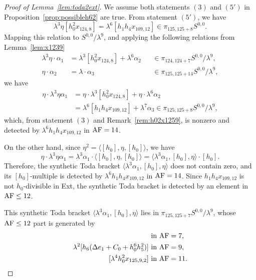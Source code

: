 \begin{proof}[Proof of Lemma~\ref{lem:toda2ext}]
    We assume both statements $(3)$ and $(5')$ in Proposition~\ref{prop:possibleh62} are true. From statement $(5')$, we have 
    $$\lambda^3 \eta [h_0^2x_{124,8}] = \lambda^6 [h_1h_4x_{109,12}] \in \pi_{125,125+8} S^{0,0}.$$
Mapping this relation to $S^{0,0}/\lambda^9$, and applying the following relations from Lemma~\ref{lem:x1239}
\begin{align*}
        \lambda^3 \eta \cdot \alpha_1 & = \lambda^3 [h_0^2 x_{124,8}] + 
\lambda^6 \alpha_2 && \in \pi_{124,124+7} S^{0,0}/\lambda^9,\\
\eta \cdot \alpha_2 & = \lambda \cdot \alpha_3 && \in \pi_{125,125+14} S^{0,0}/\lambda^9,
    \end{align*}
we have
\begin{align*}
    \eta \cdot \lambda^3 \eta \alpha_1 & = \eta \cdot \lambda^3 [h_0^2 x_{124,8}] + \eta \cdot \lambda^6 \alpha_2\\
   & = \lambda^6 [h_1h_4x_{109,12}] + \lambda^7 \alpha_3 \in \pi_{125,125+8} S^{0,0}/\lambda^9,
 \end{align*}
 which, from statement $(3)$ and Remark~\ref{rem:h02x1259}, is nonzero and detected by $\lambda^6 h_1h_4x_{109,12}$ in $\mathrm{AF}=14$.
 
 On the other hand, since $\eta^2 = \langle [h_0], \eta, [h_0] \rangle$, we have
 $$\eta \cdot \lambda^3 \eta \alpha_1 = \lambda^3 \alpha_1 \cdot \langle [h_0], \eta, [h_0] \rangle = \langle \lambda^3 \alpha_1, [h_0], \eta \rangle \cdot [h_0].$$
 Therefore, the synthetic Toda bracket
$\langle \lambda^3 \alpha_1, [h_0], \eta \rangle$
    does not contain zero, and its $[h_0]$-multiple is detected by $\lambda^6 h_1h_4x_{109,12}$ in $\mathrm{AF}=14$. Since $h_1h_4x_{109,12}$ is not $h_0$-divisible in Ext, the synthetic Toda bracket is detected by an element in $\mathrm{AF} \le 12$.
    

This synthetic Toda bracket $\langle \lambda^3 \alpha_1, [h_0], \eta \rangle$ lies in $\pi_{125,125+7} S^{0,0}/\lambda^9$, whose $\mathrm{AF} \le 12$ part is generated by
\begin{align*}
[h_0^2 x_{125,5}] \ & \text{in} \ \AF=7,\\ 
\lambda^2 [h_6(\Delta e_1 +C_0+h_0^6h_5^2)] \ & \text{in} \ \AF=9,\\ 
[\lambda^4 h_0^2 x_{125,9,2}] \ & \text{in} \ \AF=11.
\end{align*}




\end{proof}
